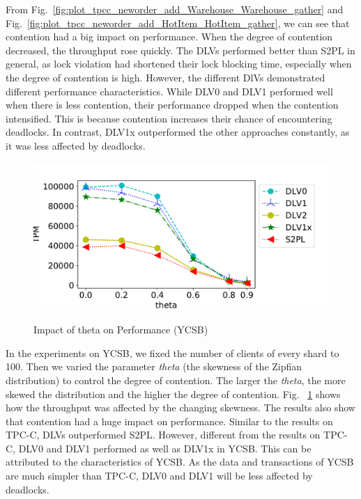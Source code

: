 \documentclass[conference]{IEEEtran}
\begin{document}
From Fig.~\ref{fig:plot_tpcc_neworder_add_Warehouse_Warehouse_gather} and
Fig.~\ref{fig:plot_tpcc_neworder_add_HotItem_HotItem_gather},
we can see that contention had a big impact on performance. When the degree of contention decreased, the throughput rose quickly.
The DLVs performed better than S2PL in general, as lock violation had shortened their lock blocking time, especially when the degree of contention is high.
However, the different DlVs demonstrated different performance characteristics. 
While DLV0 and DLV1 performed well when there is less contention, their performance dropped when the contention intensified.
This is because contention increases their chance of encountering deadlocks.
In contrast, DLV1x outperformed the other approaches constantly, as it was less affected by deadlocks.

\begin{figure}[tbp]
  \centering
      { \includegraphics[scale=0.35] {figure/plot_ycsb_add_Theta_Theta_TPM_gather} \label{fig:plot_ycsb_add_Theta_Theta_TPM_gather:tpm}}



\caption{Impact of theta on Performance (YCSB)}
\label{fig:plot_ycsb_add_Theta_Theta_TPM_gather}
\end{figure}

In the experiments on YCSB, we fixed the number of clients of every shard to 100.
Then we varied the parameter \emph{theta} (the skewness of the Zipfian distribution) to control the degree of contention.
The larger the \emph{theta}, the more skewed the distribution and the higher the degree of contention.
Fig. ~\ref{fig:plot_ycsb_add_Theta_Theta_TPM_gather} shows how the throughput was affected by the changing skewness.
The results also show that contention had a huge impact on performance.
Similar to the results on TPC-C, DLVs outperformed S2PL.
However, different from the results on TPC-C, DLV0 and DLV1 performed as well as DLV1x in YCSB.
This can be attributed to the characteristics of YCSB. As the data and transactions of YCSB are much simpler than TPC-C, DLV0 and DLV1 will be less affected by deadlocks.
\end{document}
